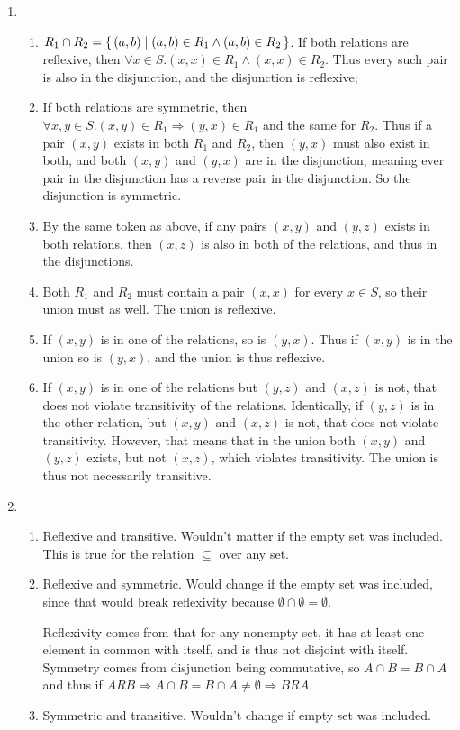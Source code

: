 \documentclass{article}
\begin{document}
\begin{enumerate}
    \item
        \begin{enumerate}
            \item $R_1 \cap R_2 = \set{(a,b) \mid (a,b) \in R_1 \land (a,b) \in R_2}$. If both relations are reflexive, then $\forall x \in S . (x,x) \in R_1 \land (x,x) \in R_2$. Thus every such pair is also in the disjunction, and the disjunction is reflexive;
        \item If both relations are symmetric, then $\forall x,y \in S. (x,y) \in R_1 \Rightarrow (y,x) \in R_1$ and the same for $R_2$.
            Thus if a pair $(x,y)$ exists in both $R_1$ and $R_2$, then $(y,x)$ must also exist in both, and both $(x,y)$ and $(y,x)$ are in the disjunction, meaning ever pair in the disjunction has a reverse pair in the disjunction. So the disjunction is symmetric.
        \item By the same token as above, if any pairs $(x,y)$ and $(y,z)$ exists in both relations, then $(x,z)$ is also in both of the relations, and thus in the disjunctions.
        \item Both $R_1$ and $R_2$ must contain a pair $(x,x)$ for every $x \in S$, so their union must as well. The union is reflexive.
        \item If $(x,y)$ is in one of the relations, so is $(y,x)$. Thus if $(x,y)$ is in the union so is $(y,x)$, and the union is thus reflexive.
        \item If $(x,y)$ is in one of the relations but $(y,z)$ and $(x,z)$ is not, that does not violate transitivity of the relations. Identically, if $(y,z)$ is in the other relation, but $(x,y)$ and $(x,z)$ is not, that does not violate transitivity. However, that means that in the union both $(x,y)$ and $(y,z)$ exists, but not $(x,z)$, which violates transitivity. The union is thus not necessarily transitive.
        \end{enumerate}
        
    \item
        \begin{enumerate}
            \item Reflexive and transitive. Wouldn't matter if the empty set was included. This is true for the relation $\subseteq$ over any set.
            \item Reflexive and symmetric. Would change if the empty set was included, since that would break reflexivity because $\emptyset \cap \emptyset = \emptyset$. 
                
                Reflexivity comes from that for any nonempty set, it has at least one element in common with itself, and is thus not disjoint with itself. Symmetry comes from disjunction being commutative, so $A \cap B = B \cap A$ and thus if $A R B \Rightarrow A \cap B = B \cap A \neq \emptyset \Rightarrow B R A$.
            \item Symmetric and transitive. Wouldn't change if empty set was included. 


\end{enumerate}
\end{enumerate}
\end{document}
